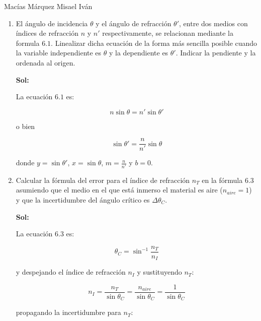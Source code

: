 \documentclass[12pt,a4paper]{article}
\begin{document}
Macías Márquez Misael Iván

\begin{enumerate}






\item El ángulo de incidencia $\theta$ y el ángulo de refracción $\theta'$, entre dos medios con índices de refracción $n$ y $n'$ respectivamente, se relacionan mediante la formula $6.1$. Linealizar dicha ecuación de la forma más sencilla posible cuando la variable independiente es $\theta$ y la dependiente es $\theta'$. Indicar la pendiente y la ordenada al origen.

\textbf{Sol:}

La ecuación $6.1$ es:

\begin{equation*}
    n\sin{\theta}=n'\sin{\theta'}
\end{equation*}

o bien

\begin{equation*}
    \sin{\theta'}=\frac{n}{n'}\sin{\theta}
\end{equation*}

donde $y=\sin{\theta'}$, $x=\sin{\theta}$, $m=\frac{n}{n'}$ y $b= 0$.







\item Calcular la fórmula del error para el índice de refracción $n_T$ en la fórmula $6.3$  asumiendo que el medio en el que está inmerso el material es aire ($n_{aire}=1$) y que la incertidumbre del ángulo crítico es $\Delta \theta_C$.

\textbf{Sol:}

La ecuación $6.3$ es:

\begin{equation*}
    \theta_C = \sin^{-1}{\frac{n_T}{n_I}}
\end{equation*}

y despejando el índice de refracción $n_I$ y sustituyendo $n_T$:

\begin{equation*}
    n_I =\frac{n_T}{\sin{\theta_C}}=\frac{n_{aire}}{\sin{\theta_C}} =\frac{1}{\sin{\theta_C}}
\end{equation*}

propagando la incertidumbre para $n_T$:


\end{enumerate}
\end{document}
